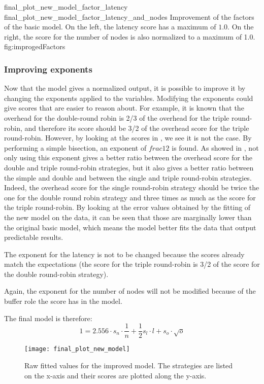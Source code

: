 \doublefigure
    {final_plot_new_model_factor_latency}
    {final_plot_new_model_factor_latency_and_nodes}
    {Improvement of the factors of the basic model. On the left, the latency
    score has a maximum of \(1.0\). On the right, the score for the number of nodes
    is also normalized to a maximum of 1.0.}
    {fig:improgedFactors}


\subsubsection{Improving exponents}
Now that the model gives a normalized output, it is possible to improve it by
changing the exponents applied to the variables. Modifying the exponents could
give scores that are easier to reason about. For example, it is known that the
overhead for the double-round robin is 2/3 of the overhead for the triple
round-robin, and therefore its score should be 3/2 of the overhead score for the
triple round-robin. However, by looking at the scores in ,
we see it is not the case. 
By performing a simple bisection, an exponent of \(frac{1}{2}\) is found. As
showed in , not only using this exponent gives a better ratio
between the overhead score for the double and triple round-robin strategies, but
it also gives a better ratio between the simple and double and between the
single and triple round-robin strategies. Indeed, the overhead score for the
single round-robin strategy should be twice the one for the double round robin
strategy and three times as much as the score for the triple round-robin.
By looking at the error values obtained by the fitting of the new model on the
data, it can be seen that those are marginally lower than the original basic
model, which means the model better fits the data that output predictable
results. 

The exponent for the latency is not to be changed because the scores already
match the expectations (the score for the triple round-robin is 3/2 of the score
for the double round-robin strategy). 

Again, the exponent for the number of nodes will not be modified because of the
buffer role the score has in the model.

The final model is therefore: 
\[1 = 2.556\cdot s_n \cdot \frac{1}{n} + \frac{1}{2} s_l\cdot l + s_o\cdot
\sqrt{o}\]


\begin{figure}[h]
    \centering
    \texttt{[image: final\_plot\_new\_model]}
    \captionsetup{justification=centering}
    \caption{Raw fitted values for the improved model. The strategies are listed
    on the x-axis and their scores are plotted along the y-axis. }
    \label{fig:recapTestsPlotNew}
\end{figure}

